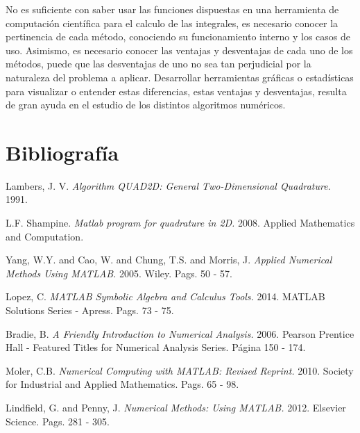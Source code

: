 \documentclass[11pt, spanish]{article}
\begin{document}
No es suficiente con saber usar las funciones dispuestas en una herramienta de computación científica para el calculo de las integrales, es necesario conocer la pertinencia de cada método, conociendo su funcionamiento interno y los casos de uso. Asimismo, es necesario conocer las ventajas y desventajas de cada uno de los métodos, puede que las desventajas de uno no sea tan perjudicial por la naturaleza del problema a aplicar. Desarrollar herramientas gráficas o estadísticas para visualizar o entender estas diferencias, estas ventajas y desventajas, resulta de gran ayuda en el estudio de los distintos algoritmos numéricos.


\section{Bibliografía}

\begingroup
\renewcommand{\section}[2]{}%
\begin{thebibliography}{}

 Lambers, J. V.  {\em Algorithm QUAD2D: General Two-Dimensional Quadrature.}  1991.

 L.F. Shampine. {\em Matlab program for quadrature in 2D.} 2008. Applied Mathematics and Computation.

 Yang, W.Y. and Cao, W. and Chung, T.S. and Morris, J. {\em Applied Numerical Methods Using MATLAB.} 2005. Wiley. Pags. 50 - 57.

 Lopez, C. {\em MATLAB Symbolic Algebra and Calculus Tools.} 2014. MATLAB Solutions Series - Apress. Pags. 73 - 75.

  Bradie, B. {\em A Friendly Introduction to Numerical Analysis.}  2006. Pearson Prentice Hall - Featured Titles for Numerical Analysis Series. Página 150 - 174.
 
  Moler, C.B. {\em Numerical Computing with MATLAB: Revised Reprint.} 2010. Society for Industrial and Applied Mathematics. Pags. 65 - 98.

 Lindfield, G. and Penny, J. {\em Numerical Methods: Using MATLAB.} 2012. Elsevier Science. Pags. 281 - 305.

\end{thebibliography}
\endgroup


\end{document}
